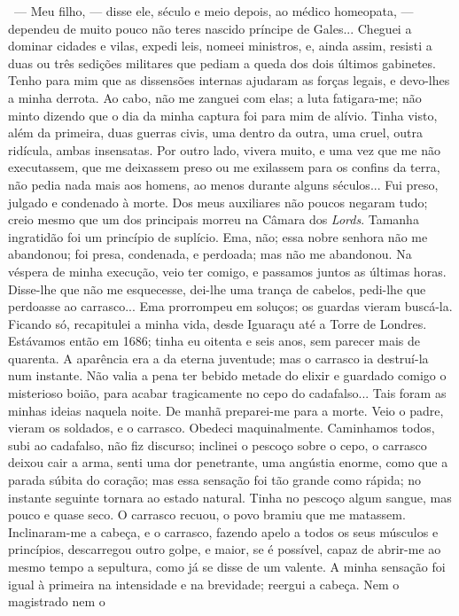 ~--- Meu filho, --- disse ele, século e meio depois, ao médico
homeopata, --- dependeu de muito pouco não teres nascido príncipe de
Gales... Cheguei a dominar cidades e vilas, expedi leis, nomeei
ministros, e, ainda assim, resisti a duas ou três sedições militares que
pediam a queda dos dois últimos gabinetes. Tenho para mim que as
dissensões internas ajudaram as forças legais, e devo-lhes a minha
derrota. Ao cabo, não me zanguei com elas; a luta fatigara-me; não minto
dizendo que o dia da minha captura foi para mim de alívio. Tinha visto,
além da primeira, duas guerras civis, uma dentro da outra, uma cruel,
outra ridícula, ambas insensatas. Por outro lado, vivera muito, e uma
vez que me não executassem, que me deixassem preso ou me exilassem para
os confins da terra, não pedia nada mais aos homens, ao menos durante
alguns séculos... Fui preso, julgado e condenado à morte. Dos meus
auxiliares não poucos negaram tudo; creio mesmo que um dos principais
morreu na Câmara dos \emph{Lords}. Tamanha ingratidão foi um princípio
de suplício. Ema, não; essa nobre senhora não me abandonou; foi presa,
condenada, e perdoada; mas não me abandonou. Na véspera de minha
execução, veio ter comigo, e passamos juntos as últimas horas. Disse-lhe
que não me esquecesse, dei-lhe uma trança de cabelos, pedi-lhe que
perdoasse ao carrasco... Ema prorrompeu em soluços; os guardas vieram
buscá-la. Ficando só, recapitulei a minha vida, desde Iguaraçu até a
Torre de Londres. Estávamos então em 1686; tinha eu oitenta e seis anos,
sem parecer mais de quarenta. A aparência era a da eterna juventude; mas
o carrasco ia destruí-la num instante. Não valia a pena ter bebido
metade do elixir e guardado comigo o misterioso boião, para acabar
tragicamente no cepo do cadafalso... Tais foram as minhas ideias naquela
noite. De manhã preparei-me para a morte. Veio o padre, vieram os
soldados, e o carrasco. Obedeci maquinalmente. Caminhamos todos, subi ao
cadafalso, não fiz discurso; inclinei o pescoço sobre o cepo, o carrasco
deixou cair a arma, senti uma dor penetrante, uma angústia enorme, como
que a parada súbita do coração; mas essa sensação foi tão grande como
rápida; no instante seguinte tornara ao estado natural. Tinha no pescoço
algum sangue, mas pouco e quase seco. O carrasco recuou, o povo bramiu
que me matassem. Inclinaram-me a cabeça, e o carrasco, fazendo apelo a
todos os seus músculos e princípios, descarregou outro golpe, e maior,
se é possível, capaz de abrir-me ao mesmo tempo a sepultura, como já se
disse de um valente. A minha sensação foi igual à primeira na
intensidade e na brevidade; reergui a cabeça. Nem o magistrado nem o
